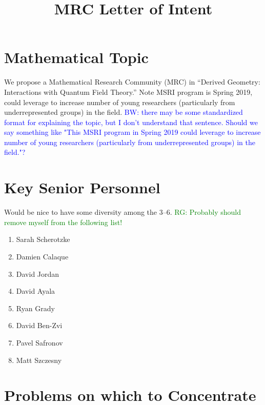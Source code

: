 \documentclass[11pt]{amsart}
\title{MRC Letter of Intent}
\def\brian{\textcolor{blue}{BW: }\textcolor{blue}}
\def\ryan{\textcolor{green}{RG: }\textcolor{green}}
\begin{document}
\maketitle

\section*{Mathematical Topic}

We propose a Mathematical Research Community (MRC) in ``Derived Geometry: Interactions with Quantum Field Theory.'' Note MSRI program is Spring 2019, could leverage to increase number of young researchers (particularly from underrepresented groups) in the field. \brian{there may be some standardized format for explaining the topic, but I don't understand that sentence. Should we say something like
"This MSRI program in Spring 2019 could leverage to increase number of young researchers (particularly from underrepresented groups) in the field."?}

\section*{Key Senior Personnel} Would be nice to have some diversity among the 3--6. \ryan{Probably should remove myself from the following list!}

\begin{enumerate}
\item \label{Sarah} Sarah Scherotzke
\item \label{Damien} Damien Calaque
\item \label{DavidJ} David Jordan
\item \label{DavidA} David Ayala
\item \label{Ryan} Ryan Grady
\item \label{DavidBZ} David Ben-Zvi
\item \label{PavelS} Pavel Safronov
\item \label{Matt} Matt Szczesny 
\end{enumerate}

\section*{Problems on which to Concentrate}
\end{document}
